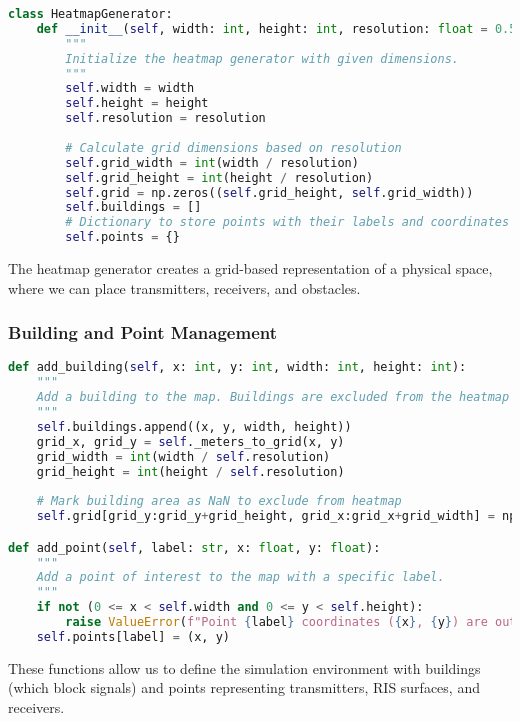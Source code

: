 \begin{lstlisting}[language=python, caption={Heatmap Generator Class}]
class HeatmapGenerator:
    def __init__(self, width: int, height: int, resolution: float = 0.5):
        """
        Initialize the heatmap generator with given dimensions.
        """
        self.width = width
        self.height = height
        self.resolution = resolution
        
        # Calculate grid dimensions based on resolution
        self.grid_width = int(width / resolution)
        self.grid_height = int(height / resolution)
        self.grid = np.zeros((self.grid_height, self.grid_width))
        self.buildings = []
        # Dictionary to store points with their labels and coordinates
        self.points = {}
\end{lstlisting}

The heatmap generator creates a grid-based representation of a physical space, where we can place transmitters, receivers, and obstacles.

\subsubsection{Building and Point Management}

\begin{lstlisting}[language=python, caption={Buildings and Points in Heatmap}]
def add_building(self, x: int, y: int, width: int, height: int):
    """
    Add a building to the map. Buildings are excluded from the heatmap calculation.
    """
    self.buildings.append((x, y, width, height))
    grid_x, grid_y = self._meters_to_grid(x, y)
    grid_width = int(width / self.resolution)
    grid_height = int(height / self.resolution)
    
    # Mark building area as NaN to exclude from heatmap
    self.grid[grid_y:grid_y+grid_height, grid_x:grid_x+grid_width] = np.nan

def add_point(self, label: str, x: float, y: float):
    """
    Add a point of interest to the map with a specific label.
    """
    if not (0 <= x < self.width and 0 <= y < self.height):
        raise ValueError(f"Point {label} coordinates ({x}, {y}) are outside the map boundaries")
    self.points[label] = (x, y)
\end{lstlisting}

These functions allow us to define the simulation environment with buildings (which block signals) and points representing transmitters, RIS surfaces, and receivers.

